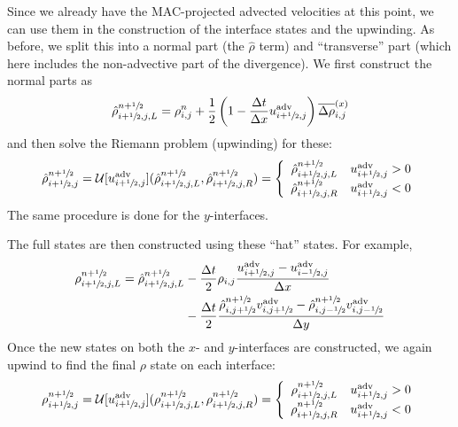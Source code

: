 \begin{enumerate}
Since we already have the MAC-projected advected velocities at this
point, we can use them in the construction of the interface states and
the upwinding.  As before, we split this into a normal part (the
$\hat{\rho}$ term) and ``transverse'' part (which here includes the
non-advective part of the divergence).  We first construct the normal
parts as
\begin{equation}
\hat{\rho}_{i+{\sfrac{1}{2}},j,L}^{n+{\sfrac{1}{2}}} = \rho_{i,j}^n + 
   \frac{1}{2} \left ( 1 - \frac{\Delta t}{\Delta x} u^\mathrm{adv}_{i+{\sfrac{1}{2}},j} \right )
   \overline{\Delta \rho}^{(x)}_{i,j}
\end{equation}
and then solve the Riemann problem (upwinding) for these:
\begin{equation}
\hat{\rho}_{i+{\sfrac{1}{2}},j}^{n+{\sfrac{1}{2}}} = 
   \mathcal{U}[u^\mathrm{adv}_{i+{\sfrac{1}{2}},j}](\hat{\rho}_{i+{\sfrac{1}{2}},j,L}^{n+{\sfrac{1}{2}}},
                                     \hat{\rho}_{i+{\sfrac{1}{2}},j,R}^{n+{\sfrac{1}{2}}}) =
  \left \{
  \begin{array}{cl}
     \hat{\rho}_{i+{\sfrac{1}{2}},j,L}^{n+{\sfrac{1}{2}}} & u^\mathrm{adv}_{i+{\sfrac{1}{2}},j} > 0 \\
     \hat{\rho}_{i+{\sfrac{1}{2}},j,R}^{n+{\sfrac{1}{2}}} & u^\mathrm{adv}_{i+{\sfrac{1}{2}},j} < 0 
  \end{array} \right .
\end{equation}
The same procedure is done for the $y$-interfaces.

The full states are then constructed using these ``hat'' states.  For example,
\begin{align}
\rho_{i+{\sfrac{1}{2}},j,L}^{n+{\sfrac{1}{2}}} = \hat{\rho}_{i+{\sfrac{1}{2}},j,L}^{n+{\sfrac{1}{2}}} 
   &- \frac{\Delta t}{2} \rho_{i,j} 
     \frac{u^\mathrm{adv}_{i+{\sfrac{1}{2}},j} - u^\mathrm{adv}_{i-{\sfrac{1}{2}},j}}{\Delta x} \nonumber \\
   &- \frac{\Delta t}{2} 
        \frac{\hat{\rho}_{i,j+{\sfrac{1}{2}}}^{n+{\sfrac{1}{2}}} v^\mathrm{adv}_{i,j+{\sfrac{1}{2}}} -
              \hat{\rho}_{i,j-{\sfrac{1}{2}}}^{n+{\sfrac{1}{2}}} v^\mathrm{adv}_{i,j-{\sfrac{1}{2}}}}{\Delta y}
\end{align}
Once the new states on both the $x$- and $y$-interfaces are constructed, we
again upwind to find the final $\rho$ state on each interface:
\begin{equation}
\rho_{i+{\sfrac{1}{2}},j}^{n+{\sfrac{1}{2}}} = 
   \mathcal{U}[u^\mathrm{adv}_{i+{\sfrac{1}{2}},j}](\rho_{i+{\sfrac{1}{2}},j,L}^{n+{\sfrac{1}{2}}},
                                     \rho_{i+{\sfrac{1}{2}},j,R}^{n+{\sfrac{1}{2}}}) =
  \left \{
  \begin{array}{cl}
     \rho_{i+{\sfrac{1}{2}},j,L}^{n+{\sfrac{1}{2}}} & u^\mathrm{adv}_{i+{\sfrac{1}{2}},j} > 0 \\
     \rho_{i+{\sfrac{1}{2}},j,R}^{n+{\sfrac{1}{2}}} & u^\mathrm{adv}_{i+{\sfrac{1}{2}},j} < 0 
  \end{array} \right .
\end{equation}



\end{enumerate}
